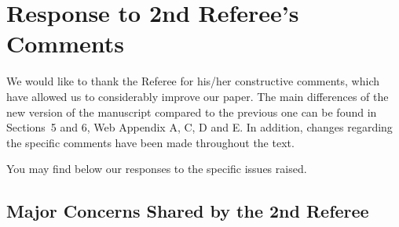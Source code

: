    \section*{Response to 2nd Referee's Comments}
    We would like to thank the Referee for his/her constructive comments, which have allowed us to considerably improve our paper. The main differences of the new version of the manuscript compared to the previous one can be found in Sections~5 and 6, Web Appendix A, C, D and E. In addition, changes regarding the specific comments have been made throughout the text.

    You may find below our responses to the specific issues raised.

    \subsection*{Major Concerns Shared by the 2nd Referee}

